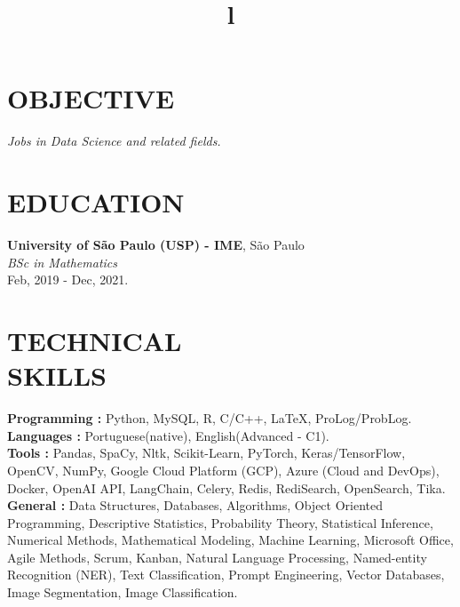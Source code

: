 \documentclass[margin]{res}
\begin{document}
\begin{resume}

\section{OBJECTIVE}
{\sl Jobs in Data Science and related fields. }

\section{EDUCATION}
\textbf{University of S\~ao Paulo (USP) - IME}, S\~ao Paulo\\
{\sl BSc in Mathematics} \\
Feb, 2019 - Dec, 2021.
 

\section{TECHNICAL\\SKILLS}

\textbf{Programming : } Python, MySQL, R, C/C++, \LaTeX , ProLog/ProbLog.
\\
\textbf{ Languages : } Portuguese(native), English(Advanced - C1). 
\\
\textbf{Tools : } Pandas, SpaCy, Nltk, Scikit-Learn, PyTorch, Keras/TensorFlow, OpenCV, NumPy, Google Cloud Platform (GCP), Azure (Cloud and DevOps), Docker, OpenAI API, LangChain, Celery, Redis, RediSearch, OpenSearch, Tika. 
\\
\textbf{General :} Data Structures, Databases, Algorithms, Object Oriented Programming, Descriptive Statistics, Probability Theory, Statistical Inference, Numerical Methods, Mathematical Modeling, Machine Learning, Microsoft Office, Agile Methods, Scrum, Kanban, Natural Language Processing, Named-entity Recognition (NER), Text Classification, Prompt Engineering, Vector Databases, Image Segmentation, Image Classification.

\begin{format}
\title{l}\\
\\
\body\\
\end{format}


\end{resume}
\end{document}
